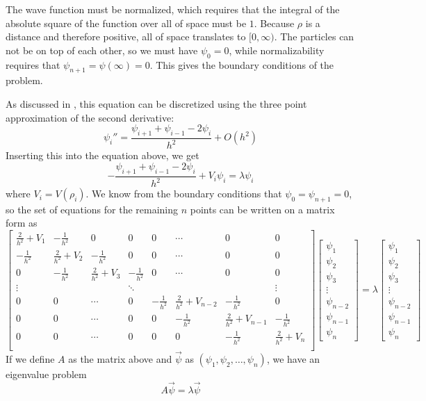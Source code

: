\documentclass[12pt,english,a4paper]{report}
\begin{document}
The wave function must be normalized, which requires that the integral of the absolute square of the function over all of space must be \(1\). Because \(\rho\) is a distance and therefore positive, all of space translates to \([0,\infty)\). The particles can not be on top of each other, so we must have \(\psi_0=0\), while normalizability requires that \(\psi_{n+1}=\psi(\infty)=0\). This gives the boundary conditions of the problem.

As discussed in \autocite{oblig1}, this equation can be discretized using the three point approximation of the second derivative:
\[
\psi_i'' = \frac{\psi_{i+1} + \psi_{i-1} - 2\psi_i}{h^2} + O(h^2)
\]
Inserting this into the equation above, we get
\[
-\frac{\psi_{i+1} + \psi_{i-1} - 2\psi_i}{h^2} + V_i\psi_i = \lambda\psi_i
\]
where \(V_i=V(\rho_i)\). We know from the boundary conditions that \(\psi_0=\psi_{n+1}=0\), so the set of equations for the remaining \(n\) points can be written on a matrix form as
\[
\begin{bmatrix}
\frac{2}{h^2} + V_1 & -\frac{1}{h^2} & 0 & 0 & 0 & \cdots & 0 & 0\\
-\frac{1}{h^2} & \frac{2}{h^2} + V_2 & -\frac{1}{h^2} & 0 & 0 & \cdots & 0 & 0\\
0 & -\frac{1}{h^2} & \frac{2}{h^2} + V_3 & -\frac{1}{h^2} & 0 & \cdots & 0 & 0\\
\vdots & & & \ddots & & & & \vdots\\
0 & 0 & \cdots & 0 & -\frac{1}{h^2} & \frac{2}{h^2} + V_{n-2} & -\frac{1}{h^2} & 0\\
0 & 0 & \cdots & 0 & 0 & -\frac{1}{h^2} & \frac{2}{h^2} + V_{n-1} & -\frac{1}{h^2}\\
0 & 0 & \cdots & 0 & 0 & 0 & -\frac{1}{h^2} & \frac{2}{h^2} + V_{n}\\
\end{bmatrix}
\begin{bmatrix}
\psi_1\\
\psi_2\\
\psi_3\\
\vdots\\
\psi_{n-2}\\
\psi_{n-1}\\
\psi_n
\end{bmatrix}
=
\lambda
\begin{bmatrix}
\psi_1\\
\psi_2\\
\psi_3\\
\vdots\\
\psi_{n-2}\\
\psi_{n-1}\\
\psi_n
\end{bmatrix}
\]
If we define \(A\) as the matrix above and \(\vec{\psi}\) as \((\psi_1,\psi_2,\dots,\psi_n)\), we have an eigenvalue problem
\[
A\vec{\psi}=\lambda\vec{\psi}
\]
\end{document}
